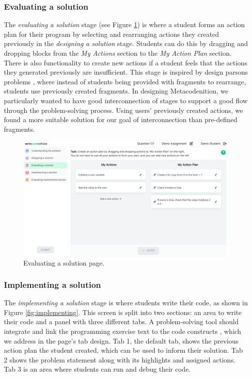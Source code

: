 \documentclass[sigconf,authorversion,nonacm]{acmart}
\begin{document}
\subsubsection{Evaluating a solution}
The \emph{evaluating a solution} stage (see Figure \ref{fig:evaluating}) is where a student forms an action plan for their program by selecting and rearranging actions they created previously in the \emph{designing a solution} stage. Students can do this by dragging and dropping blocks from the \emph{My Actions} section to the \emph{My Action Plan} section. There is also functionality to create new actions if a student feels that the actions they generated previously are insufficient. This stage is inspired by design parsons problems \cite{garcia2021}, where instead of students being provided with fragments to rearrange, students use previously created fragments. In designing Metacodenition, we particularly wanted to have good interconnection of stages to support a good flow through the problem-solving process. Using users' previously created actions, we found a more suitable solution for our goal of interconnection than pre-defined fragments.

\begin{figure}[h!]
  \centering
  \includegraphics[width=\linewidth]{evaluating-a-solution}
  \caption{Evaluating a solution page.}
  \label{fig:evaluating}
\end{figure}

\subsubsection{Implementing a solution}
The \emph{implementing a solution} stage is where students write their code, as shown in Figure \ref{fig:implementing}. This screen is split into two sections: an area to write their code and a panel with three different tabs. A problem-solving tool should integrate and link the programming exercise text to the code constructs \cite{saenz2022}, which we address in the page's tab design. Tab 1, the default tab, shows the previous action plan the student created, which can be used to inform their solution. Tab 2 shows the problem statement along with its highlights and assigned actions. Tab 3 is an area where students can run and debug their code.
\end{document}
